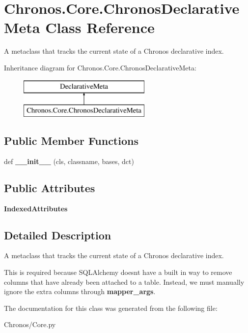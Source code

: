 \hypertarget{classChronos_1_1Core_1_1ChronosDeclarativeMeta}{}\section{Chronos.\+Core.\+Chronos\+Declarative\+Meta Class Reference}
\label{classChronos_1_1Core_1_1ChronosDeclarativeMeta}


A metaclass that tracks the current state of a Chronos declarative index.  


Inheritance diagram for Chronos.\+Core.\+Chronos\+Declarative\+Meta\+:\begin{figure}[H]
\begin{center}
\leavevmode
\includegraphics[height=2.000000cm]{classChronos_1_1Core_1_1ChronosDeclarativeMeta}
\end{center}
\end{figure}
\subsection*{Public Member Functions}
\begin{DoxyCompactItemize}
\item 
def {\bfseries \+\_\+\+\_\+init\+\_\+\+\_\+} (cls, classname, bases, dct)
\end{DoxyCompactItemize}
\subsection*{Public Attributes}
\begin{DoxyCompactItemize}
\item 
{\bfseries Indexed\+Attributes}
\end{DoxyCompactItemize}


\subsection{Detailed Description}
A metaclass that tracks the current state of a Chronos declarative index. 

This is required because S\+Q\+L\+Alchemy doesn\textquotesingle{}t have a built in way to remove columns that have already been attached to a table. Instead, we must manually ignore the \textquotesingle{}extra\textquotesingle{} columns through {\bfseries mapper\+\_\+args}. 

The documentation for this class was generated from the following file\+:\begin{DoxyCompactItemize}
\item 
Chronos/Core.\+py\end{DoxyCompactItemize}
